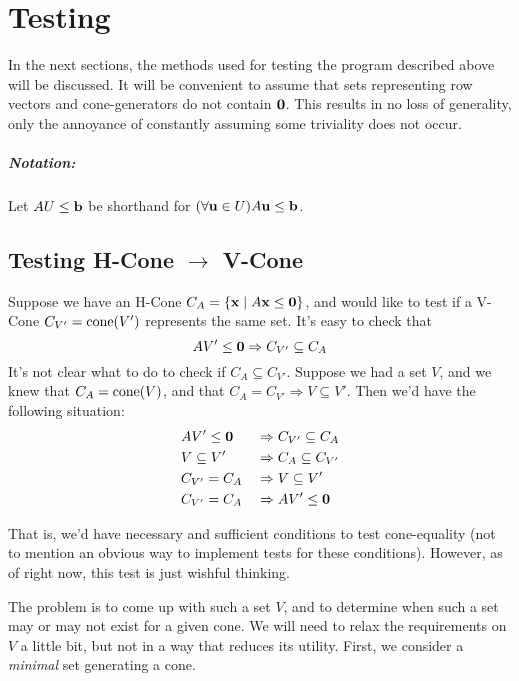 \chapter{Testing} \label{chap_testing}

In the next sections, the methods used for testing the program described above will be discussed.  It will be convenient to assume that sets representing row vectors and cone-generators do not contain $\mathbf{0}$.  This results in no loss of generality, only the annoyance of constantly assuming some triviality does not occur.

\paragraph{Notation:} Let $AU \leq \mathbf{b}$ be shorthand for $(\forall \mathbf{u}\in U) A\mathbf{u} \leq \mathbf{b}$.

\section{Testing H-Cone $\to$ V-Cone}
Suppose we have an H-Cone $C_A= \left\{\mathbf{x}\;|\; A\mathbf{x}\leq\mathbf{0}\right\}$, and would like to test if a V-Cone $C_{V'} = \operatorname{cone}(V')$ represents the same set.  It's easy to check that
\[ AV'\leq\mathbf{0} \Rightarrow C_{V'} \subseteq C_A\]
It's not clear what to do to check if $C_A\subseteq C_{V'}$.  Suppose we had a set $V$, and we knew that $C_A= \operatorname{cone}(V)$, and that $C_A= C_{V'} \Rightarrow V \subseteq V'$.  Then we'd have the following situation:
\begin{alignat*}{2}
	 & AV'\leq\mathbf{0} \;      & \Rightarrow & \; C_{V'} \subseteq C_A \\
	 & V \subseteq V' \; & \Rightarrow & \; C_A\subseteq C_{V'}  \\
	 & C_{V'} = C_A \;   & \Rightarrow & \; V \subseteq V'       \\
	 & C_{V'} = C_A \;   & \Rightarrow & \; AV'\leq\mathbf{0}
\end{alignat*}

That is, we'd have necessary and sufficient conditions to test cone-equality (not to mention an obvious way to implement tests for these conditions).  However, as of right now, this test is just wishful thinking.

The problem is to come up with such a set $V$, and to determine when such a set may or may not exist for a given cone.  We will need to relax the requirements on $V$ a little bit, but not in a way that reduces its utility.  First, we consider a \textit{minimal} set generating a cone.

